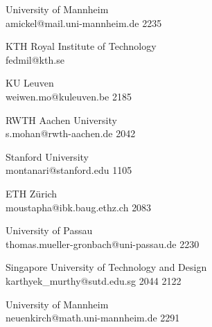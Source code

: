 \begin{multicols}{2}
 {University of Mannheim\\}%
 {amickel@mail.uni-mannheim.de}%
 {2235} %
 {} %
 {} %
 {} %
 {} %

 {KTH Royal Institute of Technology\\}%
 {fedmil@kth.se}%
 {} %
 {} %
 {} %
 {} %
 {} %

 {KU Leuven\\}%
 {weiwen.mo@kuleuven.be}%
 {2185} %
 {} %
 {} %
 {} %
 {} %

 {RWTH Aachen University\\}%
 {s.mohan@rwth-aachen.de}%
 {2042} %
 {} %
 {} %
 {} %
 {} %

 {Stanford University\\}%
 {montanari@stanford.edu}%
 {1105} %
 {} %
 {} %
 {} %
 {} %

 {ETH Z\"{u}rich\\}%
 {moustapha@ibk.baug.ethz.ch}%
 {2083} %
 {} %
 {} %
 {} %
 {} %

 {University of Passau\\}%
 {thomas.mueller-gronbach@uni-passau.de}%
 {2230} %
 {} %
 {} %
 {} %
 {} %

 {Singapore University of Technology and Design\\}%
 {karthyek_murthy@sutd.edu.sg}%
 {2044} %
 {2122} %
 {} %
 {} %
 {} %

 {University of Mannheim\\}%
 {neuenkirch@math.uni-mannheim.de}%
 {2291} %
 {} %
 {} %
 {} %
 {} %


\end{multicols}
